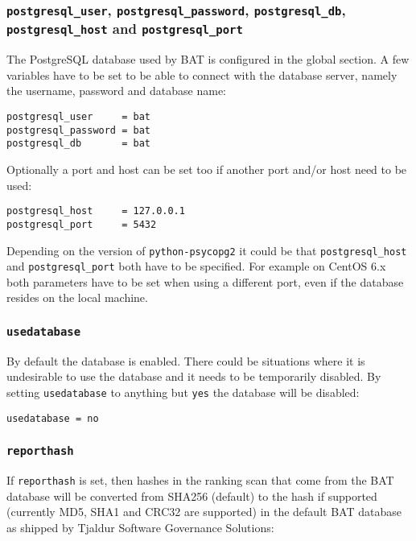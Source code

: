 \documentclass[10pt,a4paper]{article}
\begin{document}
\subsubsection{\texttt{postgresql\_user}, \texttt{postgresql\_password}, \texttt{postgresql\_db}, \texttt{postgresql\_host} and \texttt{postgresql\_port}}

The PostgreSQL database used by BAT is configured in the global section. A few
variables have to be set to be able to connect with the database server, namely
the username, password and database name:

\begin{verbatim}
postgresql_user     = bat
postgresql_password = bat
postgresql_db       = bat
\end{verbatim}

Optionally a port and host can be set too if another port and/or host need to
be used:

\begin{verbatim}
postgresql_host     = 127.0.0.1
postgresql_port     = 5432
\end{verbatim}

Depending on the version of \texttt{python-psycopg2} it could be that
\texttt{postgresql\_host} and \texttt{postgresql\_port} both have to be
specified. For example on CentOS 6.x both parameters have to be set when using
a different port, even if the database resides on the local machine.

\subsubsection{\texttt{usedatabase}}

By default the database is enabled. There could be situations where it is
undesirable to use the database and it needs to be temporarily disabled. By
setting \texttt{usedatabase} to anything but \texttt{yes} the database will
be disabled:

\begin{verbatim}
usedatabase = no
\end{verbatim}

\subsubsection{\texttt{reporthash}}

If \texttt{reporthash} is set, then hashes in the ranking scan that come from
the BAT database will be converted from SHA256 (default) to the hash if
supported (currently MD5, SHA1 and CRC32 are supported) in the default BAT
database as shipped by Tjaldur Software Governance Solutions:
\end{document}
